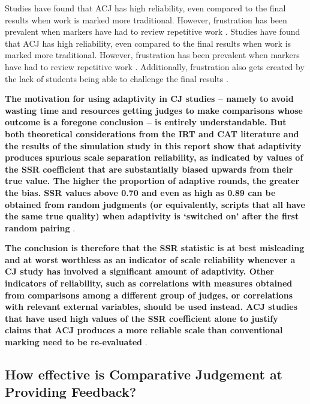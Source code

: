 	Studies have found that ACJ has high reliability, even compared to the final results when work is marked more traditional. However,  frustration has been prevalent when markers have had to review repetitive work \cite{bartholomew2019tool}. Studies have found that ACJ has high reliability, even compared to the final results when work is marked more traditional. However,  frustration has been prevalent when markers have had to review repetitive work \cite{bartholomew2019tool}. Additionally, frustration also gets created by the lack of students being able to challenge the final results \cite{bartholomew2019tool}. 
	
	\textbf{The motivation for using adaptivity in CJ studies – namely to avoid wasting time and resources getting judges to make comparisons whose outcome is a foregone conclusion – is entirely understandable. But both theoretical considerations from the IRT and CAT literature and the results of the simulation study in this report show that adaptivity produces spurious scale separation reliability, as indicated by values of the SSR coefficient that are substantially biased upwards from their true value. The higher the proportion of adaptive rounds, the greater the bias. SSR values above 0.70 and even as high as 0.89 can be obtained from random judgments (or equivalently, scripts that all have the same true quality) when adaptivity is ‘switched on’ after the first random pairing} \cite{bramley2015investigating}. 
	
	\textbf{The conclusion is therefore that the SSR statistic is at best misleading and at worst worthless as an indicator of scale reliability whenever a CJ study has involved a significant amount of adaptivity. Other indicators of reliability, such as correlations with measures obtained from comparisons among a different group of judges, or correlations with relevant external variables, should be used instead. ACJ studies that have used high values of the SSR coefficient alone to justify claims that ACJ produces a more reliable scale than conventional marking need to be re-evaluated} \cite{bramley2015investigating}.
	

	\subsection{How effective is Comparative Judgement at Providing Feedback?} %
		
	
